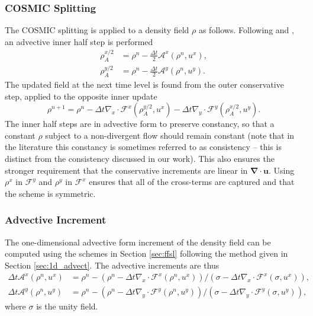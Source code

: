 \documentclass[11pt,a4paper]{article}
\begin{document}
\subsubsection{COSMIC Splitting} \label{sec:cosmic_density}
The COSMIC splitting is applied to a density field $\rho$ as follows.
Following \citet{leonard1996cosmic} and \citet{lin1996ffsl}, an advective inner half step is performed
\begin{subequations}
\begin{align}
    \rho_A^{x/2} &= \rho^n - \frac{\Delta{t}}{2} \mathcal{A}^x(\rho^n, u^x), \\
    \rho_A^{y/2} &= \rho^n - \frac{\Delta{t}}{2} \mathcal{A}^y(\rho^n, u^y).
\end{align}
\end{subequations}
The updated field at the next time level is found from the outer conservative step, applied to the opposite inner update
\begin{equation} \label{eqn:cosmic_density}
    \rho^{n+1} = \rho^{n} - \Delta{t} \nabla_x\cdot \mathcal{F}^x(\rho_A^{y/2},u^x) - \Delta{t} \nabla_y \cdot \mathcal{F}^y(\rho_A^{x/2},u^y).
\end{equation}
The inner half steps are in advective form to preserve constancy, so that a constant $\rho$ subject to a non-divergent flow should remain constant (note that in the literature this constancy is sometimes referred to as consistency -- this is distinct from the consistency discussed in our work). This also ensures the stronger requirement that the conservative increments are linear in $\bm{\nabla\cdot u}$. Using $\rho^x$ in $\mathcal{F}^y$ and $\rho^y$ in $\mathcal{F}^x$ ensures that all of the cross-terms are captured \citep{kent2019crossterms} and that the scheme is symmetric. 

\subsubsection{Advective Increment} \label{sec:advective_increment}

The one-dimensional advective form increment of the density field can be computed using the schemes in Section \ref{sec:ffsl} following the method given in Section \ref{sec:1d_advect}. The advective increments are thus
\begin{subequations} \label{eqn:advective_operators}
\begin{align}
    \Delta{t} \mathcal{A}^x(\rho^n, u^x) &= \rho^n - \left( \rho^n - \Delta{t} \nabla_x\cdot \mathcal{F}^x(\rho^n,u^x)\right)/\left( \sigma - \Delta{t} \nabla_x\cdot \mathcal{F}^x(\sigma,u^x)\right), \\
    \Delta{t} \mathcal{A}^y(\rho^n, u^y) &= \rho^n - \left( \rho^n - \Delta{t} \nabla_y\cdot \mathcal{F}^y(\rho^n,u^y)\right)/\left( \sigma - \Delta{t} \nabla_y\cdot \mathcal{F}^y(\sigma,u^y)\right),
\end{align}
\end{subequations}
where $\sigma$ is the unity field.
\end{document}

